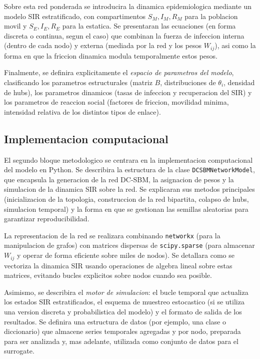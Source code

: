 Sobre esta red ponderada se introducira la dinamica epidemiologica mediante un modelo SIR estratificado, con compartimentos $S_M, I_M, R_M$ para la poblacion movil y $S_E, I_E, R_E$ para la estatica. 
Se presentaran las ecuaciones (en forma discreta o continua, segun el caso) que combinan la fuerza de infeccion interna (dentro de cada nodo) y externa (mediada por la red y los pesos $W_{ij}$), asi como la forma en que la friccion dinamica modula temporalmente estos pesos.

Finalmente, se definira explicitamente el \emph{espacio de parametros del modelo}, clasificando los parametros estructurales (matriz $B$, distribuciones de $\theta_i$, densidad de hubs), los parametros dinamicos (tasas de infeccion y recuperacion del SIR) y los parametros de reaccion social (factores de friccion, movilidad minima, intensidad relativa de los distintos tipos de enlace).

\subsection{Implementacion computacional}

El segundo bloque metodologico se centrara en la implementacion computacional del modelo en Python. 
Se describira la estructura de la clase \texttt{DCSBMNetworkModel}, que encapsula la generacion de la red DC-SBM, la asignacion de pesos y la simulacion de la dinamica SIR sobre la red. 
Se explicaran sus metodos principales (inicializacion de la topologia, construccion de la red bipartita, colapso de hubs, simulacion temporal) y la forma en que se gestionan las semillas aleatorias para garantizar reproducibilidad.

La representacion de la red se realizara combinando \texttt{networkx} (para la manipulacion de grafos) con matrices dispersas de \texttt{scipy.sparse} (para almacenar $W_{ij}$ y operar de forma eficiente sobre miles de nodos). 
Se detallara como se vectoriza la dinamica SIR usando operaciones de algebra lineal sobre estas matrices, evitando bucles explicitos sobre nodos cuando sea posible.

Asimismo, se describira el \emph{motor de simulacion}: el bucle temporal que actualiza los estados SIR estratificados, el esquema de muestreo estocastico (si se utiliza una version discreta y probabilistica del modelo) y el formato de salida de los resultados. 
Se definira una estructura de datos (por ejemplo, una clase o diccionario) que almacene series temporales agregadas y por nodo, preparada para ser analizada y, mas adelante, utilizada como conjunto de datos para el surrogate.

